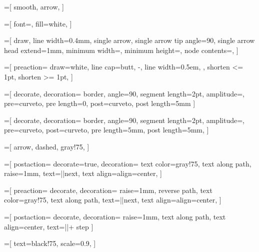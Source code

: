 =[
  smooth,
  arrow,
]

=[
  font=\footnotesize,
  fill=white,
]



\newlength{\bigarrowwidth}
\setlength{\bigarrowwidth}{5mm}
=[
  draw,
  line width=0.4mm,
  single arrow,
  single arrow tip angle=90,
  single arrow head extend=1mm,
  minimum width=\bigarrowwidth,
  minimum height=\bigarrowwidth,
  node contents={},
]

=[
  preaction={
    draw=white,
    line cap=butt,
    -,
    line width=0.5em,
  },
  shorten <= 1pt,
  shorten >= 1pt,
]

=[
  decorate,
  decoration={
    border,
    angle=90,
    segment length=2pt,
    amplitude=\pgflinewidth,
    pre=curveto,
    pre length=0,
    post=curveto,
    post length=5mm
  }
]

=[
  decorate,
  decoration={
    border,
    angle=90,
    segment length=2pt,
    amplitude=\pgflinewidth,
    pre=curveto,
    post=curveto,
    pre length=5mm,
    post length=5mm,
  }
]

=[
  arrow,
  dashed,
  gray!75,
]

=[
  postaction={
    decorate=true,
    decoration={
      text color=gray!75,
      text along path,
      raise=1mm,
      text={|\ttfamily\scriptsize|next},
      text align={align=center},
    }
  }
]

=[
  preaction={
    decorate,
    decoration={
      raise=1mm,
      reverse path,
      text color=gray!75,
      text along path,
      text={|\ttfamily\scriptsize|next},
      text align={align=center},
    }
  }
]

=[
  postaction={
    decorate,
    decoration={
      raise=1mm,
      text along path,
      text align=center,
      text={|\ttfamily \scriptsize|+ step}
    }
  }
]

=[
  text=black!75,
  scale=0.9,
]

